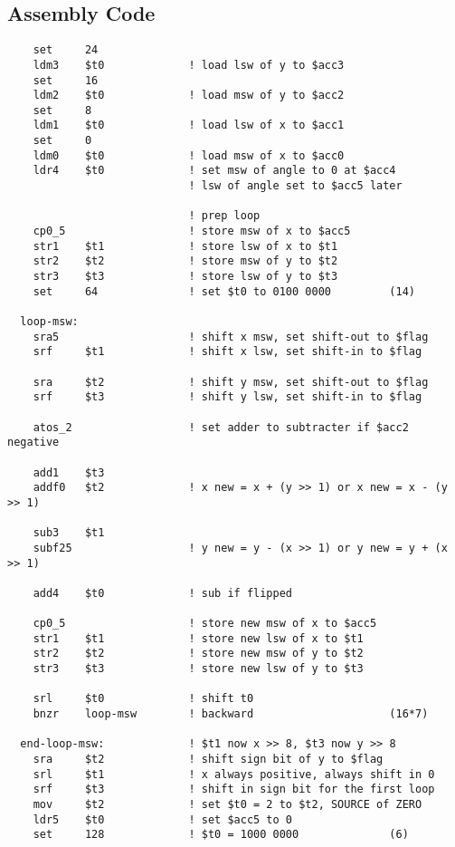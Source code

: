 \documentclass{article}
\begin{document}
  \subsection{Assembly Code}
  \begin{lstlisting}
    set     24
    ldm3    $t0             ! load lsw of y to $acc3
    set     16
    ldm2    $t0             ! load msw of y to $acc2
    set     8
    ldm1    $t0             ! load lsw of x to $acc1
    set     0
    ldm0    $t0             ! load msw of x to $acc0
    ldr4    $t0             ! set msw of angle to 0 at $acc4
                            ! lsw of angle set to $acc5 later

                            ! prep loop
    cp0_5                   ! store msw of x to $acc5
    str1    $t1             ! store lsw of x to $t1
    str2    $t2             ! store msw of y to $t2
    str3    $t3             ! store lsw of y to $t3
    set     64              ! set $t0 to 0100 0000         (14)

  loop-msw:
    sra5                    ! shift x msw, set shift-out to $flag
    srf     $t1             ! shift x lsw, set shift-in to $flag

    sra     $t2             ! shift y msw, set shift-out to $flag
    srf     $t3             ! shift y lsw, set shift-in to $flag

    atos_2                  ! set adder to subtracter if $acc2 negative

    add1    $t3
    addf0   $t2             ! x new = x + (y >> 1) or x new = x - (y >> 1)

    sub3    $t1
    subf25                  ! y new = y - (x >> 1) or y new = y + (x >> 1)

    add4    $t0             ! sub if flipped

    cp0_5                   ! store new msw of x to $acc5
    str1    $t1             ! store new lsw of x to $t1
    str2    $t2             ! store new msw of y to $t2
    str3    $t3             ! store new lsw of y to $t3

    srl     $t0             ! shift t0
    bnzr    loop-msw        ! backward                     (16*7)

  end-loop-msw:             ! $t1 now x >> 8, $t3 now y >> 8
    sra     $t2             ! shift sign bit of y to $flag
    srl     $t1             ! x always positive, always shift in 0
    srf     $t3             ! shift in sign bit for the first loop
    mov     $t2             ! set $t0 = 2 to $t2, SOURCE of ZERO
    ldr5    $t0             ! set $acc5 to 0
    set     128             ! $t0 = 1000 0000              (6)


\end{lstlisting}
\end{document}
